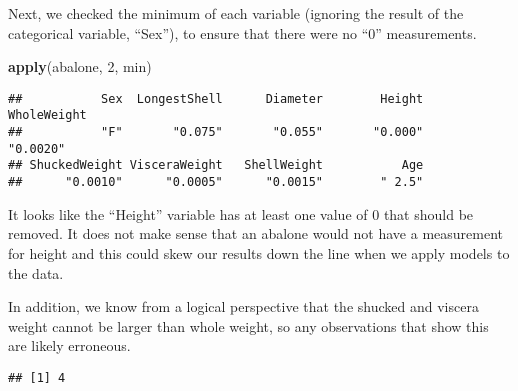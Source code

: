 \documentclass[
]{article}
\newenvironment{Shaded}{\begin{snugshade}}{\end{snugshade}}
\newcommand{\CommentTok}[1]{\textcolor[rgb]{0.56,0.35,0.01}{\textit{#1}}}
\newcommand{\DecValTok}[1]{\textcolor[rgb]{0.00,0.00,0.81}{#1}}
\newcommand{\FunctionTok}[1]{\textcolor[rgb]{0.13,0.29,0.53}{\textbf{#1}}}
\newcommand{\NormalTok}[1]{#1}
\newcommand{\SpecialCharTok}[1]{\textcolor[rgb]{0.81,0.36,0.00}{\textbf{#1}}}
\begin{document}
Next, we checked the minimum of each variable (ignoring the result of
the categorical variable, ``Sex''), to ensure that there were no ``0''
measurements.

\begin{Shaded}
\begin{Highlighting}[]
\FunctionTok{apply}\NormalTok{(abalone, }\DecValTok{2}\NormalTok{, min)}
\end{Highlighting}
\end{Shaded}

\begin{verbatim}
##           Sex  LongestShell      Diameter        Height   WholeWeight 
##           "F"       "0.075"       "0.055"       "0.000"      "0.0020" 
## ShuckedWeight VisceraWeight   ShellWeight           Age 
##      "0.0010"      "0.0005"      "0.0015"        " 2.5"
\end{verbatim}

It looks like the ``Height'' variable has at least one value of 0 that
should be removed. It does not make sense that an abalone would not have
a measurement for height and this could skew our results down the line
when we apply models to the data.

In addition, we know from a logical perspective that the shucked and
viscera weight cannot be larger than whole weight, so any observations
that show this are likely erroneous.

\begin{Shaded}
\end{Shaded}

\begin{verbatim}
## [1] 4
\end{verbatim}

\begin{Shaded}
\end{Shaded}
\end{document}
